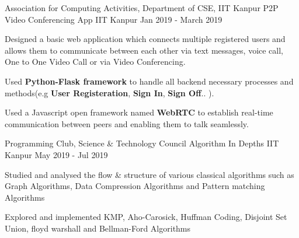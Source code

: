 \begin{cventries}
    \cventry
    {Association for Computing Activities, Department of CSE, IIT Kanpur}
    {P2P Video Conferencing App}
    {IIT Kanpur}
    {Jan 2019 - March 2019}
    {
      \begin{cvitems}
        \item {Designed a basic web application which connects multiple registered users and allows them to communicate between each other  via text messages, voice call, One to One Video Call or via Video Conferencing.}
        \item {Used \textbf{Python-Flask framework} to handle all backend necessary processes and methods(e.g \textbf{User Registeration}, \textbf{Sign In}, \textbf{Sign Off}.. ).}
        \item {Used a Javascript open framework named \textbf{WebRTC} to establish real-time communication between peers and enabling them to talk seamlessly.}
      \end{cvitems}
    } 
	\cventry
	{Programming Club, Science \& Technology Council}
	{Algorithm In Depths}
	{IIT Kanpur}
	{May 2019 - Jul 2019}
	{
		\begin{cvitems}
			\item {Studied and analysed the flow \& structure of various classical algorithms such as Graph Algorithms, Data Compression Algorithms and Pattern matching Algorithms}
			\item {Explored and implemented KMP, Aho-Carosick, Huffman	Coding, Disjoint Set Union, floyd warshall and Bellman-Ford Algorithms}
		\end{cvitems}
	}   
\end{cventries}

